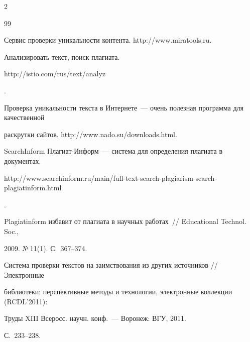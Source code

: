 \begin{multicols}{2}
{{\begin{thebibliography}{99}
  


  Сервис проверки уникальности контента. {\sf http://\linebreak www.miratools.ru}.

  


  Анализировать текст, поиск плагиата. {\sf 

http://\linebreak istio.com/rus/text/analyz}.

  


  Проверка уникальности текста в Интернете~--- очень полезная программа для качественной 

раскрутки сайтов. {\sf http://www.nado.su/downloads.html}.

  


  SearchInform Плагиат-Информ~--- сис\-те\-ма для определения плагиата в документах. {\sf 

http://www.\linebreak searchinform.ru/main/full-text-search-plagiarism-search-plagiatinform.html}.

  



  Plagiatinform избавит от плагиата в научных работах~// Educational Technol. Soc., 

2009. №\,11(1). С.~367--374.



\label{end\stat}

  



  Система проверки текстов на заимствования из других источников // Электронные 

библиотеки: перспективные методы и технологии, электронные коллекции (RCDL'2011):\linebreak 

Труды XIII Всеросс. научн. конф.~--- Воронеж: ВГУ, 2011. 

С.~233--238.



 \end{thebibliography}

}

}





\end{multicols}

